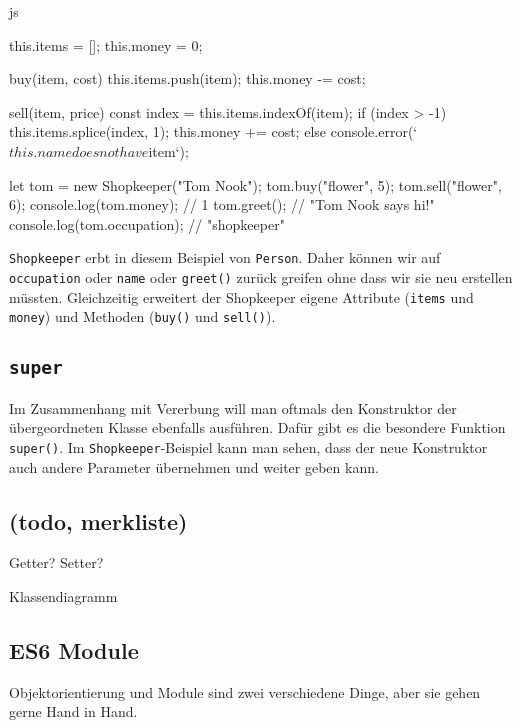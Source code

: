 \documentclass[10pt,a4paper]{article}
\begin{document}
\begin{multicols}{3}
\begin{codebox}{js}{}
{{    this.items = [];
    this.money = 0;
  }

  buy(item, cost) {
    this.items.push(item);
    this.money -= cost;
  }

  sell(item, price) {
    const index = this.items.indexOf(item);
    if (index > -1) {
      this.items.splice(index, 1);
      this.money += cost;
    } else {
      console.error(`${this.name} does not have ${item}`);
    }
  }
}

let tom = new Shopkeeper("Tom Nook");
tom.buy("flower", 5);
tom.sell("flower", 6);
console.log(tom.money); // 1
tom.greet(); // "Tom Nook says hi!"
console.log(tom.occupation); // "shopkeeper"
\end{codebox}

\texttt{Shopkeeper} erbt in diesem Beispiel von \texttt{Person}. Daher können wir auf \texttt{occupation} oder \texttt{name} oder \texttt{greet()} zurück greifen ohne dass wir sie neu erstellen müssten. Gleichzeitig erweitert der Shopkeeper eigene Attribute (\texttt{items} und \texttt{money}) und Methoden (\texttt{buy()} und \texttt{sell()}).

\subsection*{\texttt{super}}
Im Zusammenhang mit Vererbung will man oftmals den Konstruktor der übergeordneten Klasse ebenfalls ausführen. Dafür gibt es die besondere Funktion \texttt{super()}. Im \texttt{Shopkeeper}-Beispiel kann man sehen, dass der neue Konstruktor auch andere Parameter übernehmen und weiter geben kann.

\subsection*{(todo, merkliste)}
Getter? Setter?

Klassendiagramm



\newpage

\subsection*{ES6 Module}
Objektorientierung und Module sind zwei verschiedene Dinge, aber sie gehen gerne Hand in Hand.






\printbibliography
{}
\end{multicols}
\end{document}
